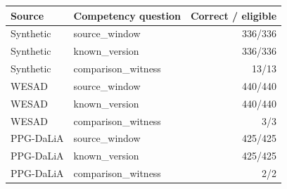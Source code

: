 \begin{tabular}{llr}
\toprule
Source & Competency question & Correct / eligible \\
\midrule
Synthetic & source\_window & 336/336 \\
Synthetic & known\_version & 336/336 \\
Synthetic & comparison\_witness & 13/13 \\
WESAD & source\_window & 440/440 \\
WESAD & known\_version & 440/440 \\
WESAD & comparison\_witness & 3/3 \\
PPG-DaLiA & source\_window & 425/425 \\
PPG-DaLiA & known\_version & 425/425 \\
PPG-DaLiA & comparison\_witness & 2/2 \\
\bottomrule
\end{tabular}
